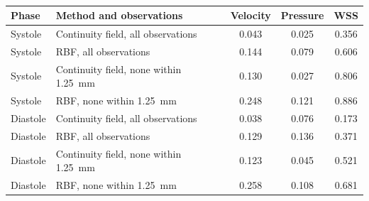 \begin{table}[htbp]
\centering
\small
\caption{}
\label{tab:nearwall}
\begin{tabular}{llccc}
\toprule
Phase & Method and observations & Velocity & Pressure & WSS \\
\midrule
Systole & Continuity field, all observations & 0.043 & 0.025 & 0.356 \\
Systole & RBF, all observations & 0.144 & 0.079 & 0.606 \\
Systole & Continuity field, none within 1.25~mm & 0.130 & 0.027 & 0.806 \\
Systole & RBF, none within 1.25~mm & 0.248 & 0.121 & 0.886 \\
\addlinespace
Diastole & Continuity field, all observations & 0.038 & 0.076 & 0.173 \\
Diastole & RBF, all observations & 0.129 & 0.136 & 0.371 \\
Diastole & Continuity field, none within 1.25~mm & 0.123 & 0.045 & 0.521 \\
Diastole & RBF, none within 1.25~mm & 0.258 & 0.108 & 0.681 \\
\bottomrule
\end{tabular}
\end{table}
